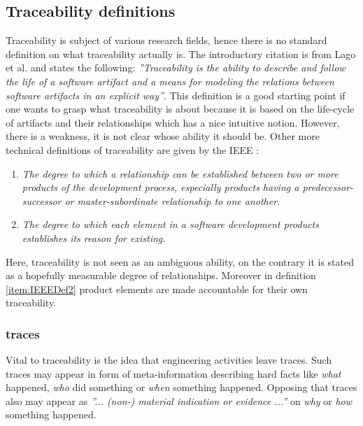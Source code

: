 \subsection{Traceability definitions}
Traceability is subject of various research fields, hence there is no standard definition on what traceability actually is. 
The introductory citation is from Lago et al. \cite{ScopedTraceability} and states the following: 
\textit{''Traceability is the ability to describe and follow the life of a software artifact and a means for modeling the relations between software artifacts in an explicit way''}. 
This definition is a good starting point if one wants to grasp what traceability is about because it is based on the life-cycle of artifacts and their relationships which has a nice intuitive notion. 
However, there is a weakness, it is not clear whose ability it should be. Other more technical definitions of traceability are given by the IEEE \cite{IEEEGlossary}:
\begin{enumerate}

\item 
\label{item:IEEEDef1}
\textit{The degree to which a relationship can be established between two or more products of the development process, especially products having a predecessor-successor or master-subordinate relationship to one another.}

\item 
\label{item:IEEEDef2}
\textit{The degree to which each element in a software development products establishes its reason for existing.}

\end{enumerate}
Here, traceability is not seen as an ambiguous ability, on the contrary it is stated as a hopefully measurable degree of relationships. 
Moreover in definition \ref{item:IEEEDef2} product elements are made accountable for their own traceability.


\subsubsection{traces}
Vital to traceability is the idea that engineering activities leave traces. 
Such traces may appear in form of meta-information describing hard facts like \textit{what} happened, \textit{who} did something or \textit{when} something happened. 
Opposing that traces also may appear as \textit{''... (non-) material indication or evidence ...''} \cite{OED} on \textit{why} or \textit{how} something happened. 

